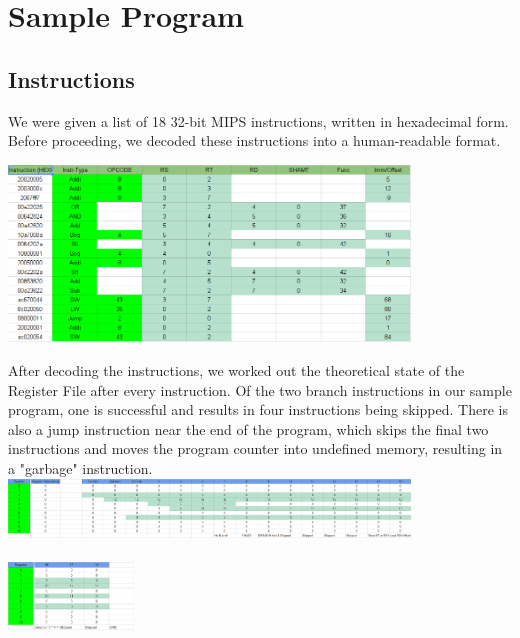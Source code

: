 \documentclass{article}
\begin{document}
\section{Sample Program}
\subsection{Instructions}
We were given a list of 18 32-bit MIPS instructions, written in hexadecimal form. Before proceeding, we decoded these instructions into a human-readable format.

\includegraphics[width=0.8\textwidth]{example_program_decoded_instructions.png}

After decoding the instructions, we worked out the theoretical state of the Register File after every instruction. Of the two branch instructions in our sample program, one is successful and results in four instructions being skipped. There is also a jump instruction near the end of the program, which skips the final two instructions and moves the program counter into undefined memory, resulting in a "garbage" instruction. \\


\includegraphics[width=0.8\textwidth]{example_program_registerfile_part1.png} \\ \\
\includegraphics[width=0.25\textwidth]{example_program_registerfile_part2.png} 
	
\end{document}
